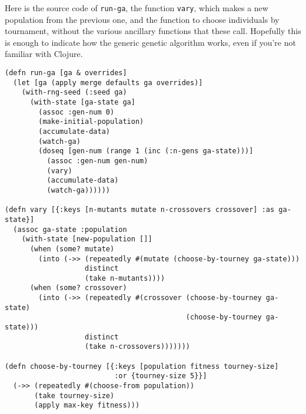\documentclass[letterpaper,11pt]{report}
\begin{document}
Here is the source code of \texttt{run-ga}, the function \texttt{vary},
which makes a new population from the previous one, and the function to choose
individuals by tournament, without the various ancillary functions that these
call. Hopefully this is enough to indicate how the generic genetic algorithm
works, even if you're not familiar with Clojure.
\begin{verbatim}
(defn run-ga [ga & overrides]
  (let [ga (apply merge defaults ga overrides)]
    (with-rng-seed (:seed ga)
      (with-state [ga-state ga]
        (assoc :gen-num 0)
        (make-initial-population)
        (accumulate-data)
        (watch-ga)
        (doseq [gen-num (range 1 (inc (:n-gens ga-state)))]
          (assoc :gen-num gen-num)
          (vary)
          (accumulate-data)
          (watch-ga))))))

(defn vary [{:keys [n-mutants mutate n-crossovers crossover] :as ga-state}]
  (assoc ga-state :population
    (with-state [new-population []]
      (when (some? mutate)
        (into (->> (repeatedly #(mutate (choose-by-tourney ga-state)))
                   distinct
                   (take n-mutants))))
      (when (some? crossover)
        (into (->> (repeatedly #(crossover (choose-by-tourney ga-state)
                                           (choose-by-tourney ga-state)))
                   distinct
                   (take n-crossovers)))))))

(defn choose-by-tourney [{:keys [population fitness tourney-size]
                          :or {tourney-size 5}}]
  (->> (repeatedly #(choose-from population))
       (take tourney-size)
       (apply max-key fitness)))
\end{verbatim}
\end{document}

